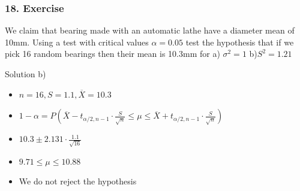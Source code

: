 \documentclass{beamer}
\begin{document}
\begin{frame}
\frametitle{18. Exercise}

We claim that bearing made with an automatic lathe have a diameter mean of 10mm. Using a test with critical values $\alpha = 0.05$ test the hypothesis that if we pick 16 random bearings then their mean is 10.3mm for a) $\sigma^2 = 1$ b)$S^2 = 1.21$ 

Solution b)
\begin{itemize}
\item<2-> $n =16, S = 1.1, \overline{X} = 10.3$
\item<3-> $1 - \alpha = P(\overline{X} - t_{\alpha/2, n-1} \cdot \frac{S}{\sqrt{n}} \leq \mu \leq \overline{X} + t_{\alpha/2, n-1} \cdot \frac{S}{\sqrt{n}})$
\item<4-> $10.3 \pm 2.131 \cdot \frac{1.1}{\sqrt{16}}$
\item<5-> $9.71 \leq \mu \leq 10.88$
\item<5-> We do not reject the hypothesis
\end{itemize}
\end{frame}
\end{document}
